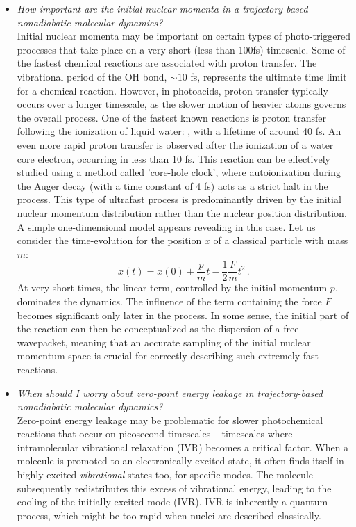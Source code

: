 \documentclass[9pt,bestpractices]{livecoms}
\begin{document}
\begin{itemize}
\item{\textit{How important are the initial nuclear momenta in a trajectory-based nonadiabatic molecular dynamics?} \\
Initial nuclear momenta may be important on certain types of photo-triggered processes that take place on a very short (less than 100fs) timescale. Some of the fastest chemical reactions are associated with proton transfer. The vibrational period of the OH bond, $\sim10$ fs, represents the ultimate time limit for a chemical reaction. However, in photoacids, proton transfer typically occurs over a longer timescale, as the slower motion of heavier atoms governs the overall process. One of the fastest known reactions is proton transfer following the ionization of liquid water: , with a lifetime of around 40 fs.\cite{schnorr2023direct} An even more rapid proton transfer is observed after the ionization of a water core electron, occurring in less than 10 fs.\cite{stia2010theoretical} This reaction can be effectively studied using a method called 'core-hole clock', where autoionization during the Auger decay (with a time constant of 4 fs) acts as a strict halt in the process. This type of ultrafast process is predominantly driven by the initial nuclear momentum distribution rather than the nuclear position distribution. A simple one-dimensional model appears revealing in this case. Let us consider the time-evolution for the position $x$ of a classical particle with mass $m$:
\begin{equation*}
x(t)=x(0) + \frac{p}{m}t - \frac{1}{2} \frac{F}{m} t^2 \, .
\end{equation*}
At very short times, the linear term, controlled by the initial momentum $p$, dominates the dynamics. The influence of the term containing the force $F$ becomes significant only later in the process. In some sense, the initial part of the reaction can then be conceptualized as the dispersion of a free wavepacket, meaning that an accurate sampling of the initial nuclear momentum space is crucial for correctly describing such extremely fast reactions. 
}

\item{\textit{When should I worry about zero-point energy leakage in trajectory-based nonadiabatic molecular dynamics?} \\
Zero-point energy leakage may be problematic for slower photochemical reactions that occur on picosecond timescales -- timescales where intramolecular vibrational relaxation (IVR) becomes a critical factor. When a molecule is promoted to an electronically excited state, it often finds itself in highly excited \textit{vibrational} states too, for specific modes. The molecule subsequently redistributes this excess of vibrational energy, leading to the cooling of the initially excited mode (IVR).\cite{Karmakar2020IVR} IVR is inherently a quantum process, which might be too rapid when nuclei are described classically.

}
\end{itemize}
\end{document}
